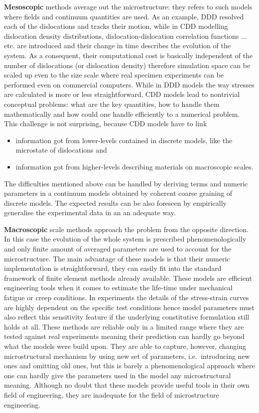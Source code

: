\textbf{Mesoscopic} methods average out the microstructure: they refers to such models where  fields and continuum quantities are used. As an example, DDD resolved each of the dislocations and tracks their motion, while in CDD modelling dislocation density distributions, dislocation-dislocation correlation functions ... etc. are introduced and their change in time describes the evolution of the system. As a consequent, their computational cost is basically independent of the number of dislocations (or dislocation density) therefore simulation space can be scaled up even to the size scale where real specimen experiments can be performed even on commercial computers. While in DDD models the way stresses are calculated is more or less straightforward, CDD models lead to nontrivial conceptual problems: what are the key quantities, how to handle them mathematically and how could one handle efficiently to a numerical problem. This challenge is not surprising, because CDD models have to link
\begin{itemize}
\item information got from lower-levels contained in discrete models, like the microstate of dislocations and
\item information got from higher-levels describing materials on macroscopic scales.
\end{itemize}
The difficulties mentioned above can be handled by deriving terms and numeric parameters in a continuum models obtained by coherent coarse graining of discrete models. The expected results can be also foreseen by empirically generalise the experimental data in an an adequate way.

\textbf{Macroscopic} scale methods approach the problem from the opposite direction. In this case the evolution of the whole system is prescribed phenomenologically and only finite amount of averaged parameters are used to account for the microstructure. The main advantage of these models is that their numeric implementation is straightforward, they can easily fit into the standard framework of finite element methods already available. These models are efficient engineering tools when it comes to estimate the life-time \cite{Connolly_2014_MST, Le_2014_IJP} under mechanical fatigue or creep conditions. In experiments the details of the stress-strain curves are highly dependent on the specific test conditions hence model parameters must also reflect this sensitivity feature if the underlying constitutive formulation still holds at all. These methods are reliable only in a limited range where they are tested against real experiments meaning their prediction can hardly go beyond what the models were build upon. They are able to capture, however, changing microstructural mechanism by using new set of parameters, i.e.\ introducing new ones and omitting old ones, but this is barely a phenomenological approach where one can hardly give the parameters used in the model any microstructural meaning. Although no doubt that these models provide useful tools in their own field of engineering, they are inadequate for the field of microstructure engineering.


